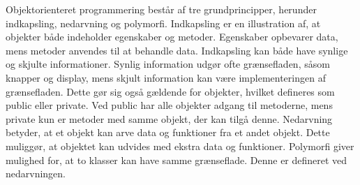 \noindent
Objektorienteret programmering består af tre grundprincipper, herunder indkapsling, nedarvning og polymorfi. Indkapsling er en illustration af, at objekter både indeholder egenskaber og metoder. Egenskaber opbevarer data, mens metoder anvendes til at behandle data. Indkapsling kan både have synlige og skjulte informationer. Synlig information udgør  ofte grænsefladen, såsom knapper og display, mens skjult information kan være implementeringen af grænsefladen. Dette gør sig også gældende for objekter, hvilket defineres som public eller private. Ved public har alle objekter adgang til metoderne, mens private kun er metoder med samme objekt, der kan tilgå denne. Nedarvning betyder, at et objekt kan arve data og funktioner fra et andet objekt. Dette muliggør, at objektet kan udvides med ekstra data og funktioner. Polymorfi giver mulighed for, at to klasser kan have samme grænseflade. Denne er defineret ved nedarvningen.\cite{Stefanov2013}
